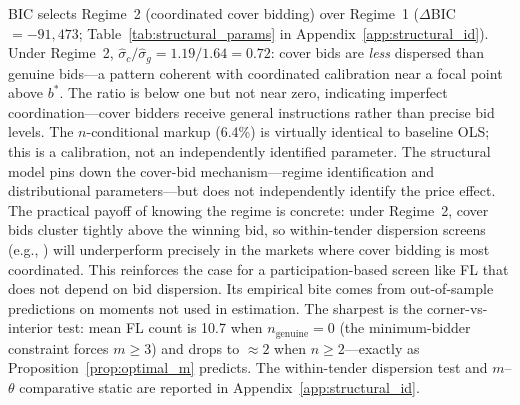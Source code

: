 BIC selects Regime~2 (coordinated cover bidding) over Regime~1
($\Delta$BIC~$= -91{,}473$;
Table~\ref{tab:structural_params} in
Appendix~\ref{app:structural_id}). Under Regime~2,
$\hat{\sigma}_c / \hat{\sigma}_g = 1.19/1.64 = 0.72$: cover bids are
\emph{less} dispersed than genuine bids---a pattern coherent with
coordinated calibration near a focal point above $b^*$. The ratio is below one but
not near zero, indicating imperfect coordination---cover bidders receive
general instructions rather than precise bid levels. The $n$-conditional markup (6.4\%) is virtually identical to baseline
OLS; this is a calibration, not an independently identified parameter.
The structural model pins down the cover-bid mechanism---regime
identification and distributional parameters---but does not
independently identify the price effect. The practical payoff of
knowing the regime is concrete: under Regime~2, cover bids cluster
tightly above the winning bid, so within-tender dispersion screens
(e.g., \citealt{imhof2019detecting}) will underperform precisely in
the markets where cover bidding is most coordinated. This reinforces
the case for a participation-based screen like FL that does not depend
on bid dispersion. Its empirical bite comes from
out-of-sample predictions on moments not used in estimation. The
sharpest is the corner-vs-interior test: mean FL count is 10.7 when
$n_{\text{genuine}} = 0$ (the minimum-bidder constraint forces $m
\geq 3$) and drops to $\approx 2$ when $n \geq 2$---exactly as
Proposition~\ref{prop:optimal_m} predicts. The within-tender
dispersion test and $m$--$\theta$ comparative static are reported in
Appendix~\ref{app:structural_id}.
